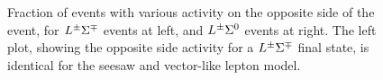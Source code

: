 \begin{figure}
	\caption{Fraction of events with various activity on the opposite side of the event, for $L^{\pm}\Sigma^{\mp}$ events at left, and $L^{\pm}\Sigma^0$ events at right. The left plot, showing the opposite side activity for a $L^{\pm}\Sigma^{\mp}$ final state, is identical for the seesaw and vector-like lepton model.
	}
	\label{fig:opposite-side-br}
\end{figure}

